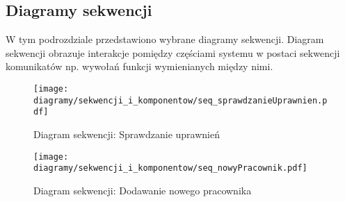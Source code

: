 \subsection{Diagramy sekwencji}
\begin{adjustwidth}{2em}{0pt}

W tym podrozdziale przedstawiono wybrane diagramy sekwencji. Diagram sekwencji obrazuje interakcje pomiędzy częściami systemu w postaci sekwencji komunikatów np. wywołań funkcji wymienianych między nimi. 

\begin{figure}[H]
    \centering
    \texttt{[image: diagramy/sekwencji\_i\_komponentow/seq\_sprawdzanieUprawnien.pdf]}
    \caption{Diagram sekwencji: Sprawdzanie uprawnień}
    \label{fig:seq_sprawdzanieUprawnien.pdf}
\end{figure} 

\begin{figure}[H]
    \centering
    \texttt{[image: diagramy/sekwencji\_i\_komponentow/seq\_nowyPracownik.pdf]}
    \caption{Diagram sekwencji: Dodawanie nowego pracownika}
    \label{fig:seq_nowyPracownik.pdf}
\end{figure} 

\begin{figure}[H]
\end{figure} 

\end{adjustwidth}
